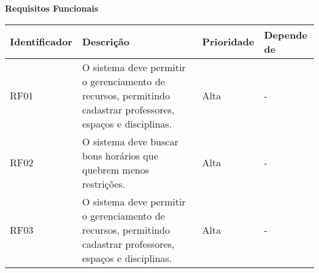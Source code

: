 \documentclass[a4paper, 12pt]{article}
\begin{document}
	
		
	\begin{landscape}
		
		\noindent \textbf{Requisitos Funcionais}
		
		\begin{table}[htp]
			\begin{center}
				\begin{tabular}{|p{3cm}|p{12.5cm}|p{2.5cm}|p{6cm}|}
					\hline
					\textbf{Identificador} & \textbf{Descrição} & \textbf{Prioridade} & \textbf{Depende de} \\
					\hline
					RF01 & O sistema deve permitir o gerenciamento de recursos, permitindo cadastrar professores, espaços e disciplinas. & Alta & - \\
					\hline
					RF02 & O sistema deve buscar bons horários que quebrem menos restrições. & Alta & - \\
					\hline
					RF03 & O sistema deve permitir o gerenciamento de recursos, permitindo cadastrar professores, espaços e disciplinas. & Alta & - \\
					\hline
				\end{tabular}
			\end{center}
		\end{table}
	\end{landscape}
	
	
	
	
\end{document}
